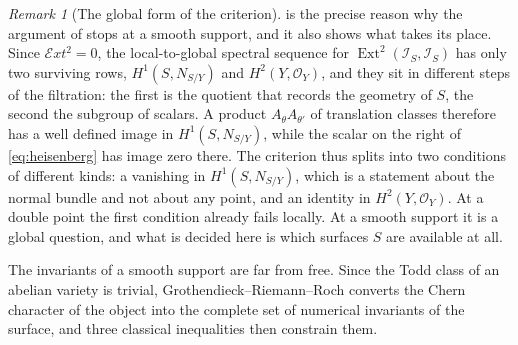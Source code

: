 \documentclass[11pt,reqno]{amsart}
\theoremstyle{plain}
\theoremstyle{definition}
\theoremstyle{remark}
\newtheorem{remark}[theorem]{Remark}
\newcommand{\cE}{\mathcal{E}}
\newcommand{\cO}{\mathcal{O}}
\newcommand{\cI}{\mathcal{I}}
\DeclareMathOperator{\Ext}{Ext}
\begin{document}
\begin{remark}[The global form of the criterion]\label{rem:obstructionmoves}
 is the precise reason why the argument of
 stops at a smooth support, and it also shows what
takes its place. Since $\cE xt^{2}=0$, the local-to-global spectral sequence
for $\Ext^{2}(\cI_{S},\cI_{S})$ has only two surviving rows,
$H^{1}(S,N_{S/Y})$ and $H^{2}(Y,\cO_{Y})$, and they sit in different steps of
the filtration: the first is the quotient that records the geometry of $S$,
the second the subgroup of scalars. A product $A_{\theta}A_{\theta'}$ of
translation classes therefore has a well defined image in $H^{1}(S,N_{S/Y})$,
while the scalar on the right of \eqref{eq:heisenberg} has image zero there.
The criterion thus splits into two conditions of different kinds: a vanishing
in $H^{1}(S,N_{S/Y})$, which is a statement about the normal bundle and not
about any point, and an identity in $H^{2}(Y,\cO_{Y})$. At a double point the
first condition already fails locally. At a smooth support it is a global
question, and what is decided here is which surfaces $S$ are available at
all.
\end{remark}

The invariants of a smooth support are far from free. Since the Todd class of
an abelian variety is trivial, Grothendieck--Riemann--Roch converts the Chern
character of the object into the complete set of numerical invariants of the
surface, and three classical inequalities then constrain them.
\end{document}

